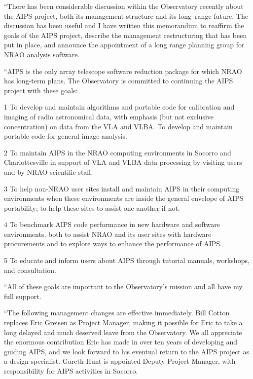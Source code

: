 {\narrower
     ``There has been considerable discussion within the Observatory
recently about the AIPS project, both its management structure and its
long--range future.  The discussion has been useful and I have written
this memorandum to reaffirm the goals of the AIPS project, describe
the management restructuring that has been put in place, and announce
the appointment of a long range planning group for NRAO analysis
software.

     ``AIPS is the only array telescope software reduction package for which
NRAO has long-term plans.  The Observatory is committed to continuing the
AIPS project with these goals:

\item 1 To develop and maintain algorithms and portable code for
calibration and imaging of radio astronomical data, with emphasis
(but not exclusive concentration) on data from the VLA and VLBA.
To develop and maintain portable code for general image analysis.

\item 2 To maintain AIPS in the NRAO computing environments in Socorro and
Charlottesville in support of VLA and VLBA data processing by
visiting users and by NRAO scientific staff.

\item 3 To help non-NRAO user sites install and maintain AIPS in their
computing environments when these environments are inside the
general envelope of AIPS portability; to help these sites to
assist one another if not.

\item 4 To benchmark AIPS code performance in new hardware and software
environments, both to assist NRAO and its user sites with hardware
procurements and to explore ways to enhance the performance of
AIPS.

\item 5 To educate and inform users about AIPS through tutorial manuals,
workshops, and consultation.

``All of these goals are important to the Observatory's mission and all have
my full support.

     ``The following management changes are effective immediately.  Bill
Cotton replaces Eric Greisen as Project Manager, making it possible
for Eric to take a long delayed and much deserved leave from the
Observatory.  We all appreciate the enormous contribution Eric has
made in over ten years of developing and guiding AIPS, and we look
forward to his eventual return to the AIPS project as a design
specialist.  Gareth Hunt is appointed Deputy Project Manager, with
responsibility for AIPS activities in Socorro.

}
